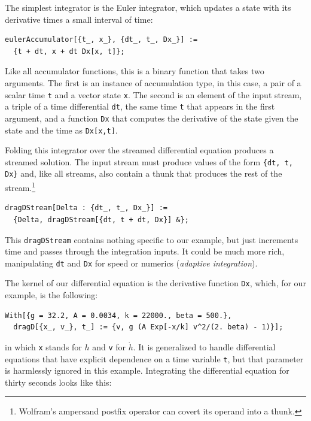 \documentclass[10pt,oneside,x11names]{article}
\begin{document}
The simplest integrator is the Euler integrator, which updates a state with its
derivative times a small interval of time: 

\begin{verbatim}
eulerAccumulator[{t_, x_}, {dt_, t_, Dx_}] :=
  {t + dt, x + dt Dx[x, t]};
\end{verbatim}

Like all accumulator functions, this is a binary function that takes two
arguments. The first is an instance of accumulation type, in this case, a
pair of a scalar time \texttt{t} and a vector state \texttt{x}. The second is an element of
the input stream, a triple of a time differential \texttt{dt}, the same time \texttt{t} that
appears in the first argument, and a function \texttt{Dx} that computes the derivative
of the state given the state and the time as \texttt{Dx[x,t]}.

Folding this integrator over the streamed differential equation produces a
streamed solution. The input stream must produce values of the form 
\texttt{\{dt, t, Dx\}} and, like all streams, also contain a thunk that produces the rest of the
stream.\footnote{Wolfram's ampersand postfix operator can covert its operand into a thunk.}

\begin{verbatim}
dragDStream[Delta : {dt_, t_, Dx_}] :=
  {Delta, dragDStream[{dt, t + dt, Dx}] &};
\end{verbatim}

This \texttt{dragDStream} contains nothing specific to our example, but just increments
time and passes through the integration inputs. It could be much more rich,
manipulating \texttt{dt} and \texttt{Dx} for speed or numerics (\emph{adaptive integration}).

The kernel of our differential equation is the derivative function \texttt{Dx}, which,
for our example, is the following:

\begin{verbatim}
With[{g = 32.2, A = 0.0034, k = 22000., beta = 500.},
  dragD[{x_, v_}, t_] := {v, g (A Exp[-x/k] v^2/(2. beta) - 1)}];
\end{verbatim}

\noindent in which \texttt{x} stands for \(h\) and \texttt{v} for \(\dot{h}\). It is generalized
to handle differential equations that have explicit dependence on a time
variable \texttt{t}, but that parameter is harmlessly ignored in this example.
Integrating the differential equation for thirty seconds looks like this:
\end{document}
